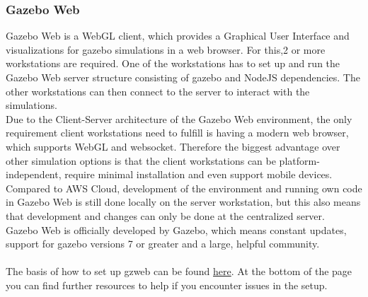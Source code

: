 \documentclass[plainarticle,zihtitle,english,final,hyperref,utf8]{zihpub}
\begin{document}
\newpage
\subsubsection{Gazebo Web}
\label{sec:gazeboweb}
\newline
Gazebo Web is a WebGL client, which provides a Graphical User Interface and visualizations for gazebo simulations in a web browser. For this,2 or more workstations are required. One of the workstations has to set up and run the Gazebo Web server structure consisting of gazebo and NodeJS dependencies. The other workstations can then connect to the server to interact with the simulations.\\
\newline
Due to the Client-Server architecture of the Gazebo Web environment, the only requirement client workstations need to fulfill is having a modern web browser, which supports WebGL and websocket. Therefore the biggest advantage over other simulation options is that the client workstations can be platform-independent, require minimal installation and even support mobile devices. Compared to AWS Cloud, development of the environment and running own code in Gazebo Web is still done locally on the server workstation, but this also means that development and changes can only be done at the centralized server.\\
\newline
Gazebo Web is officially developed by Gazebo, which means constant updates, support for gazebo versions 7 or greater and a large, helpful community.\\ 
\\
The basis of how to set up gzweb can be found \href{http://gazebosim.org/gzweb.html}{here}. At the bottom of the page you can find further resources to help if you encounter issues in the setup. 
\newline
\end{document}
